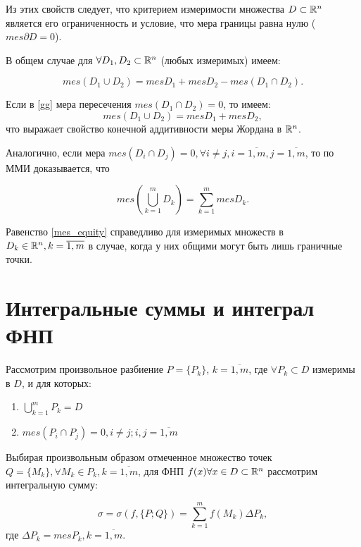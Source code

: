 \documentclass[../../main.tex]{subfiles}
\begin{document}
Из этих свойств следует, что критерием измеримости множества $D \subset \mathbb{R}^n$ 
является его ограниченность и условие, что мера границы равна нулю
 ($ mes\partial D = 0 $).

В общем случае для $\forall D_1, D_2 \subset \mathbb{R}^n$ (любых измеримых) имеем:

\begin{equation}
\label{gg}
mes (D_1 \cup D_2) = mes D_1 + mesD_2 - mes(D_1 \cap D_2).
\end{equation}

Если в \eqref{gg} мера пересечения $mes(D_1 \cap D_2) = 0$, то имеем:
\[
	mes(D_1 \cup D_2) = mesD_1 + mesD_2,
\]
что выражает свойство конечной аддитивности меры Жордана в $\mathbb{R}^n$.

Аналогично, если мера $mes(D_i \cap D_j) = 0, 
\forall i \ne j, i = \overline{1,m}, j = \overline{1,m}$, 
то по ММИ доказывается, что

\begin{equation}
\label{mes_equity}
mes\left(\bigcup_{k=1}^m D_k \right) = \sum_{k=1}^{m} mesD_k.
\end{equation}

Равенство \eqref{mes_equity} справедливо для измеримых множеств 
в $D_k \in \mathbb{R}^n, k = \overline{1,m}$ в случае, 
когда у них общими могут быть лишь граничные точки.

\section{Интегральные суммы и интеграл ФНП}

Рассмотрим произвольное разбиение $P = \{P_k\}$, ${k = \overline{1, m}}$,
где $\forall P_k \subset D$ измеримы в $D$, и для которых:

\begin{enumerate}
	\item $\bigcup\limits_{k = 1}^m P_k = D$
	\item $mes(P_i \cap P_j) = 0, i \neq j; i, j = \overline{1, m}$
\end{enumerate}

Выбирая произвольным образом отмеченное множество точек 
$Q = \{M_k\}, \forall M_k \in P_k, k = \overline{1, m}$,
для ФНП $f(x) \forall x \in D \subset \mathbb{R}^n $ рассмотрим интегральную сумму:

\begin{equation}
\sigma = \sigma(f, \{P; Q\}) = \sum\limits_{k = 1}^mf(M_k)\Delta{P_k},
\end{equation}
где $\Delta{P_k} = mes P_k, k = \overline{1, m}$.
\end{document}
